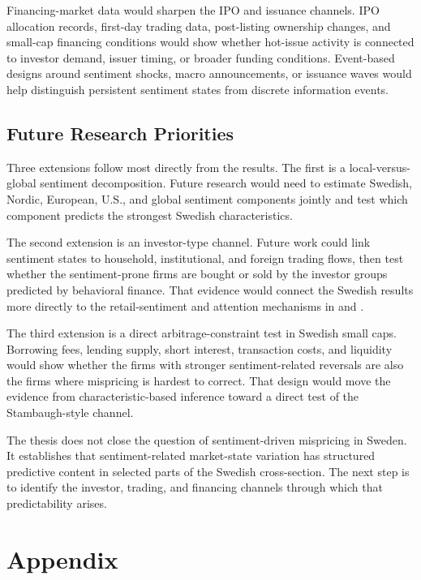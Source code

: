 \documentclass[11pt]{article}
\begin{document}
Financing-market data would sharpen the IPO and issuance channels. IPO allocation records, first-day trading data, post-listing ownership changes, and small-cap financing conditions would show whether hot-issue activity is connected to investor demand, issuer timing, or broader funding conditions. Event-based designs around sentiment shocks, macro announcements, or issuance waves would help distinguish persistent sentiment states from discrete information events.

\subsection{Future Research Priorities}
Three extensions follow most directly from the results. The first is a local-versus-global sentiment decomposition. Future research would need to estimate Swedish, Nordic, European, U.S., and global sentiment components jointly and test which component predicts the strongest Swedish characteristics.

The second extension is an investor-type channel. Future work could link sentiment states to household, institutional, and foreign trading flows, then test whether the sentiment-prone firms are bought or sold by the investor groups predicted by behavioral finance. That evidence would connect the Swedish results more directly to the retail-sentiment and attention mechanisms in \citet{kumar2006retail} and \citet{barber2008glitters}.

The third extension is a direct arbitrage-constraint test in Swedish small caps. Borrowing fees, lending supply, short interest, transaction costs, and liquidity would show whether the firms with stronger sentiment-related reversals are also the firms where mispricing is hardest to correct. That design would move the evidence from characteristic-based inference toward a direct test of the Stambaugh-style channel.

The thesis does not close the question of sentiment-driven mispricing in Sweden. It establishes that sentiment-related market-state variation has structured predictive content in selected parts of the Swedish cross-section. The next step is to identify the investor, trading, and financing channels through which that predictability arises.

\clearpage
\appendix
\section{Appendix}
\end{document}
